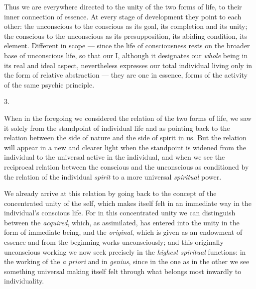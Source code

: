 \documentclass[12pt,a4paper,openany]{book}
\newcommand{\secnum}[1]{\par\begin{center}#1\end{center}\par\nobreak}
\newcommand{\opage}[1]{\marginnote{\footnotesize\textit{[#1]}}}
\begin{document}
Thus we are everywhere directed to the unity of the two forms of life,
to their inner connection of essence. At every stage of development
they point to each other: the unconscious to the conscious as its
goal, its completion and its unity; the conscious to the unconscious
as its presupposition, its abiding condition, its element. Different
in scope --- since the life of consciousness rests on the broader base
of unconscious life, so
\opage{52}that our I, although it designates our \emph{whole} being in
its real and ideal aspect, nevertheless expresses our total individual
living only in the form of relative abstraction --- they are one in
essence, forms of the activity of the same psychic principle.

\secnum{3.}

When in the foregoing we considered the relation of the two forms of
life, we saw it solely from the standpoint of individual life and as
pointing back to the relation between the side of nature and the side
of spirit in us. But the relation will appear in a new and clearer
light when the standpoint is widened from the individual to the
universal active in the individual, and when we see the reciprocal
relation between the conscious and the unconscious as conditioned by
the relation of the individual \emph{spirit} to a more universal
\emph{spiritual} power.

We already arrive at this relation by going back to the concept of the
concentrated unity of the self, which makes itself felt in an
immediate way in the individual's conscious life. For in this
concentrated unity we can distinguish between the \emph{acquired},
which, as assimilated, has entered into the unity in the form of
immediate being, and the \emph{original}, which is given as an
endowment of essence and from the beginning works unconsciously; and
this originally unconscious working we now seek precisely in the
\emph{highest spiritual} functions: in the working of the \emph{a
priori} and in \emph{genius}, since in the one as in the other we see
something universal making itself felt through what belongs most
inwardly to individuality.
\end{document}
